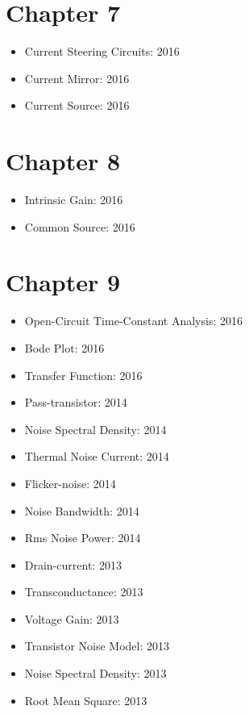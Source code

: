 \documentclass[twocolumn]{article}
\begin{document}
  \section*{Chapter 7}
    \begin{itemize}
      \item Current Steering Circuits: 2016
      \item Current Mirror: 2016
      \item Current Source: 2016
    \end{itemize}
  \section*{Chapter 8}
    \begin{itemize}
      \item Intrinsic Gain: 2016
      \item Common Source: 2016
    \end{itemize}
  \section*{Chapter 9}
    \begin{itemize}
      \item Open-Circuit Time-Constant Analysis: 2016
      \item Bode Plot: 2016
      \item Transfer Function: 2016

      \item Pass-transistor: 2014
      \item Noise Spectral Density: 2014
      \item Thermal Noise Current: 2014
      \item Flicker-noise: 2014
      \item Noise Bandwidth: 2014
      \item Rms Noise Power: 2014

      \item Drain-current: 2013
      \item Transconductance: 2013
      \item Voltage Gain: 2013
      \item Transistor Noise Model: 2013
      \item Noise Spectral Density: 2013
      \item Root Mean Square: 2013
    \end{itemize}
\end{document}
